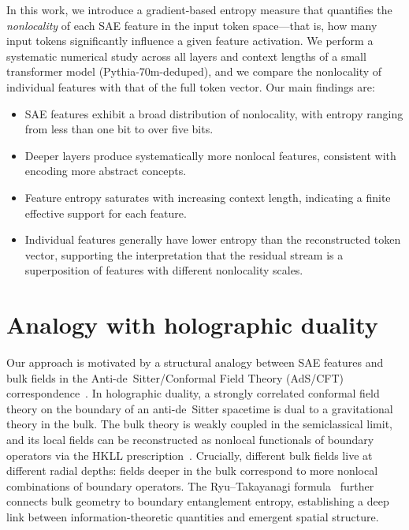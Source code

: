 \documentclass{article}
\begin{document}
In this work, we introduce a gradient-based entropy measure that quantifies
the \emph{nonlocality} of each SAE feature in the input token space---that
is, how many input tokens significantly influence a given feature
activation. We perform a systematic numerical study across all layers and
context lengths of a small transformer model (Pythia-70m-deduped), and we
compare the nonlocality of individual features with that of the full token
vector. Our main findings are:
\begin{itemize}
    \item SAE features exhibit a broad distribution of nonlocality, with
          entropy ranging from less than one bit to over five bits.
    \item Deeper layers produce systematically more nonlocal features,
          consistent with encoding more abstract concepts.
    \item Feature entropy saturates with increasing context length,
          indicating a finite effective support for each feature.
    \item Individual features generally have lower entropy than the
          reconstructed token vector, supporting the interpretation that
          the residual stream is a superposition of features with different
          nonlocality scales.
\end{itemize}

\section{Analogy with holographic duality}
\label{sec:holography}

Our approach is motivated by a structural analogy between SAE features and
bulk fields in the Anti-de~Sitter/Conformal Field Theory (AdS/CFT)
correspondence~\citep{maldacena1999large, qi2018spacetime}. In holographic
duality, a strongly correlated conformal field theory on the boundary of an
anti-de~Sitter spacetime is dual to a gravitational theory in the bulk.
The bulk theory is weakly coupled in the semiclassical limit, and its
local fields can be reconstructed as nonlocal functionals of boundary
operators via the HKLL prescription~\citep{hamilton2006holographic}.
Crucially, different bulk fields live at different radial depths: fields
deeper in the bulk correspond to more nonlocal combinations of boundary
operators. The Ryu--Takayanagi formula~\citep{ryu2006holographic} further
connects bulk geometry to boundary entanglement entropy, establishing a
deep link between information-theoretic quantities and emergent spatial
structure.
\end{document}
